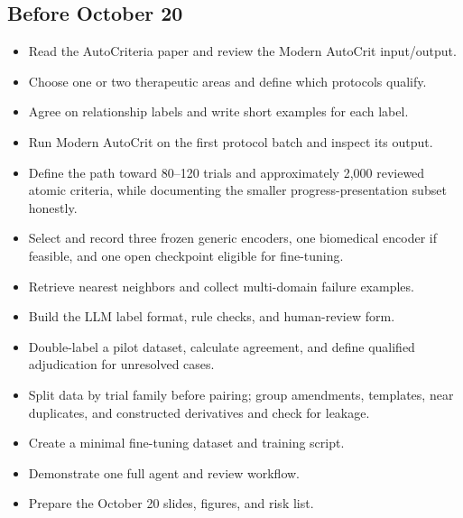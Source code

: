 \documentclass[11pt]{article}
\begin{document}
\subsection*{Before October 20}
\begin{itemize}[label=$\square$]
    \item Read the AutoCriteria paper and review the Modern AutoCrit input/output.
    \item Choose one or two therapeutic areas and define which protocols qualify.
    \item Agree on relationship labels and write short examples for each label.
    \item Run Modern AutoCrit on the first protocol batch and inspect its output.
    \item Define the path toward 80--120 trials and approximately 2,000 reviewed atomic criteria, while documenting the smaller progress-presentation subset honestly.
    \item Select and record three frozen generic encoders, one biomedical encoder if feasible, and one open checkpoint eligible for fine-tuning.
    \item Retrieve nearest neighbors and collect multi-domain failure examples.
    \item Build the LLM label format, rule checks, and human-review form.
    \item Double-label a pilot dataset, calculate agreement, and define qualified adjudication for unresolved cases.
    \item Split data by trial family before pairing; group amendments, templates, near duplicates, and constructed derivatives and check for leakage.
    \item Create a minimal fine-tuning dataset and training script.
    \item Demonstrate one full agent and review workflow.
    \item Prepare the October 20 slides, figures, and risk list.
\end{itemize}
\end{document}
